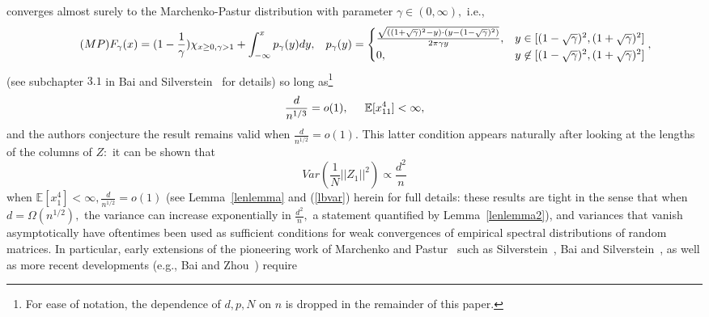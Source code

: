 \documentclass{article}
\numberwithin{equation}{section}
\begin{document}
converges almost surely to the Marchenko-Pastur distribution with parameter \(\gamma \in (0,\infty),\) i.e., %
\begin{equation}\tag{\(MP\)}\label{mplaws}
    F_\gamma(x)=(1-\frac{1}{\gamma})\chi_{x \geq 0,\gamma>1}+\int_{-\infty}^{x}{p_{\gamma}(y)dy}, \hspace{0.3cm} p_{\gamma}(y)=\begin{cases}
    \frac{\sqrt{((1+\sqrt{\gamma})^2-y) \cdot (y-(1-\sqrt{\gamma})^2)}}{2\pi \gamma y}, & y \in [(1-\sqrt{\gamma})^2,(1+\sqrt{\gamma})^2]\\
0, & y \not \in [(1-\sqrt{\gamma})^2,(1+\sqrt{\gamma})^2]
\end{cases},
\end{equation}
(see subchapter \(3.1\) in Bai and Silverstein~\cite{baisilvbook} for details) so long as\footnote{For ease of notation, the dependence of \(d,p,N\) on \(n\) is dropped in the remainder of this paper.} 
\[\frac{d}{n^{1/3}}=o(1), \hspace{0.5cm} \mathbb{E}[x_{11}^4]<\infty,\] 
and the authors conjecture the result remains valid when \(\frac{d}{n^{1/2}}=o(1).\) This latter condition appears naturally after looking at the lengths of the columns of \(Z:\) it can be shown that %
\begin{equation}\tag{\(V1\)}\label{varz0}
    Var(\frac{1}{N}||Z_1||^2) \propto \frac{d^2}{n}
\end{equation}
when \(\mathbb{E}[x_1^4]<\infty,\frac{d}{n^{1/2}}=o(1)\) (see Lemma~\ref{lenlemma} and (\ref{lbvar}) herein for full details: these results are tight in the sense that when \(d=\Omega(n^{1/2}),\) the variance can increase exponentially in \(\frac{d^2}{n},\) a statement quantified by Lemma~\ref{lenlemma2}), and variances that vanish asymptotically have oftentimes been used as sufficient conditions for weak convergences of empirical spectral distributions of random matrices. In particular, early extensions of the pioneering work of Marchenko  and Pastur~\cite{marchenkopastur} such as Silverstein~\cite{silv1}, Bai and Silverstein~\cite{silv2}, as well as more recent developments (e.g., Bai and Zhou~\cite{baizhou}) require 
\end{document}
